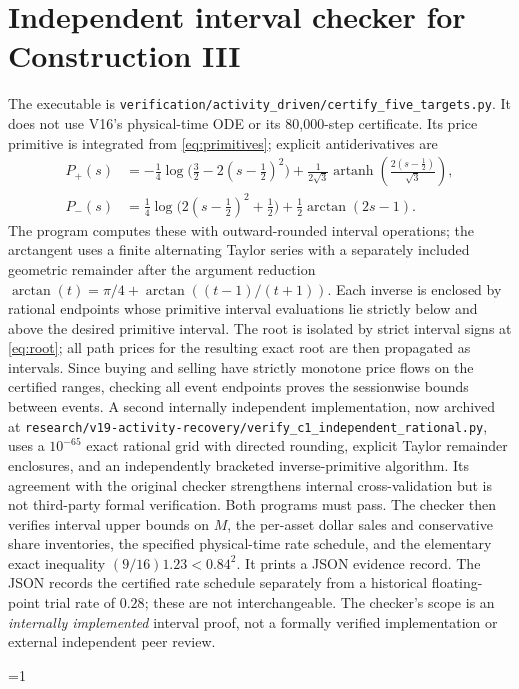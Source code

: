 \documentclass[review,hidelinks,onefignum,onetabnum]{siamonline250211}%
\def\isSIAM{1}%
\def\isSIAM{0}%
\begin{document}
\section{Independent interval checker for Construction III}\label{app:interval}
The executable is
\texttt{verification/activity\_driven/certify\_five\_targets.py}.
It does not use V16's physical-time ODE or its 80,000-step
certificate. Its price primitive is integrated from
\eqref{eq:primitives}; explicit antiderivatives are
\begin{align*}
 P_+(s)&=-\frac14\log\bigl(\tfrac32-2(s-\tfrac12)^2\bigr)
 +\frac1{2\sqrt3}\operatorname{artanh}
   \!\left(\frac{2(s-\tfrac12)}{\sqrt3}\right),\\
 P_-(s)&=\frac14\log\bigl(2(s-\tfrac12)^2+\tfrac12\bigr)
 +\frac12\arctan(2s-1).
\end{align*}
The program computes these with outward-rounded interval
operations; the arctangent uses a finite alternating Taylor series
with a separately included geometric remainder after the
argument reduction $\arctan(t)=\pi/4+\arctan((t-1)/(t+1))$.
Each inverse is enclosed by rational endpoints whose primitive
interval evaluations lie strictly below and above the desired
primitive interval. The root is isolated by strict interval signs
at \eqref{eq:root}; all path prices for the resulting exact root
are then propagated as intervals. Since buying and selling have
strictly monotone price flows on the certified ranges, checking
all event endpoints proves the sessionwise bounds between events.
A second internally independent implementation, now archived at
\texttt{research/v19-activity-recovery/verify\_c1\_independent\_rational.py},
uses a $10^{-65}$ exact rational grid with directed rounding,
explicit Taylor remainder enclosures, and an independently
bracketed inverse-primitive algorithm. Its agreement with the
original checker strengthens internal cross-validation but
is not third-party formal verification. Both programs must pass.
The checker then verifies interval upper bounds on $M$, the
per-asset dollar sales and conservative share inventories, the
specified physical-time rate schedule, and the elementary exact
inequality $(9/16)1.23<0.84^2$. It prints a JSON evidence record.
The JSON records the certified rate schedule separately from a
historical floating-point trial rate of $0.28$; these are not
interchangeable. The checker's scope is an \emph{internally
implemented} interval proof, not a formally verified implementation
or external independent peer review.

\ifnum\isSIAM=1

\else

\fi
\enlargethispage{2\baselineskip}
{\small}
\end{document}
